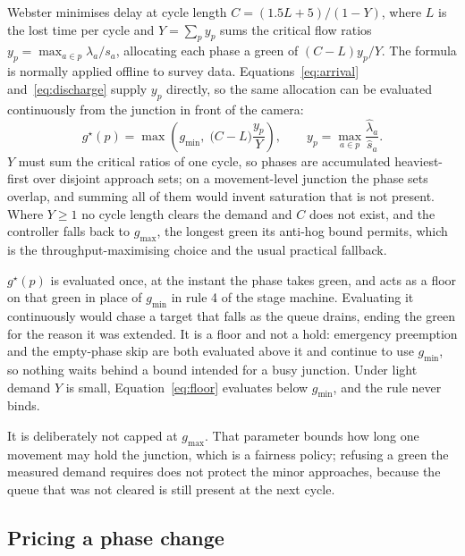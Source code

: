 \documentclass[journal]{IEEEtran}
\begin{document}
Webster \cite{Webster1958TrafficSignalSettings} minimises delay at cycle length
$C = (1.5L + 5)/(1 - Y)$, where $L$ is the lost time per cycle and $Y = \sum_p y_p$ sums the critical
flow ratios $y_p = \max_{a \in p} \lambda_a / s_a$, allocating each phase a green of $(C - L)y_p/Y$.
The formula is normally applied offline to survey data. Equations~\ref{eq:arrival}
and~\ref{eq:discharge} supply $y_p$ directly, so the same allocation can be evaluated continuously
from the junction in front of the camera:
\begin{equation}
g^\star(p) = \max\!\left(g_{\min},\; \bigl(C - L\bigr)\frac{y_p}{Y}\right), \qquad
y_p = \max_{a \in p} \frac{\hat{\lambda}_a}{\hat{s}_a}.
\label{eq:floor}
\end{equation}
$Y$ must sum the critical ratios of one cycle, so phases are accumulated heaviest-first over disjoint
approach sets; on a movement-level junction the phase sets overlap, and summing all of them would
invent saturation that is not present. Where $Y \geq 1$ no cycle length clears the demand and $C$ does
not exist, and the controller falls back to $g_{\max}$, the longest green its anti-hog bound permits,
which is the throughput-maximising choice and the usual practical fallback.

$g^\star(p)$ is evaluated once, at the instant the phase takes green, and acts as a floor on that
green in place of $g_{\min}$ in rule 4 of the stage machine. Evaluating it continuously would chase a
target that falls as the queue drains, ending the green for the reason it was extended. It is a floor
and not a hold: emergency preemption and the empty-phase skip are both evaluated above it and
continue to use $g_{\min}$, so nothing waits behind a bound intended for a busy junction. Under light
demand $Y$ is small, Equation~\ref{eq:floor} evaluates below $g_{\min}$, and the rule never binds.

It is deliberately not capped at $g_{\max}$. That parameter bounds how long one movement may hold the
junction, which is a fairness policy; refusing a green the measured demand requires does not protect
the minor approaches, because the queue that was not cleared is still present at the next cycle.

\subsection{Pricing a phase change}
\label{sec:cost}
\end{document}
